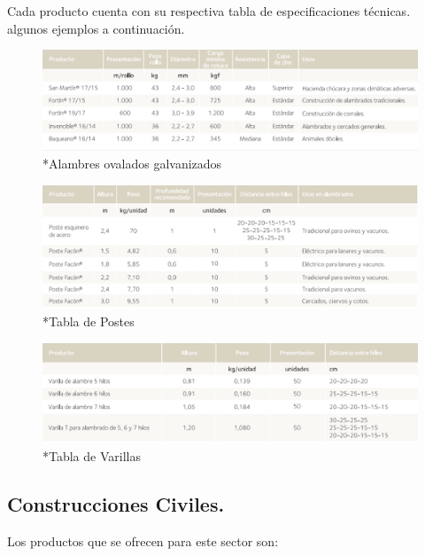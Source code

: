 \documentclass[12pt,a4paper]{article}
\begin{document}
\medskip
Cada producto cuenta con su respectiva tabla de especificaciones técnicas. algunos ejemplos a continuación.
\begin{figure}[H]    
    \centering         
    \includegraphics[width=1\textwidth]{Inagenes para latex/10.png}
    \caption*{*Alambres ovalados galvanizados}
\end{figure}
 \begin{figure}[H]    
    \centering         
    \includegraphics[width=1\textwidth]{Inagenes para latex/11.png}
    \caption*{*Tabla de Postes}
\end{figure}
 \begin{figure}[H]    
    \centering         
    \includegraphics[width=1\textwidth]{Inagenes para latex/12.png}
    \caption*{*Tabla de Varillas}
\end{figure}


\subsection{Construcciones Civiles.}
Los productos que se ofrecen para este sector son:
\end{document}

